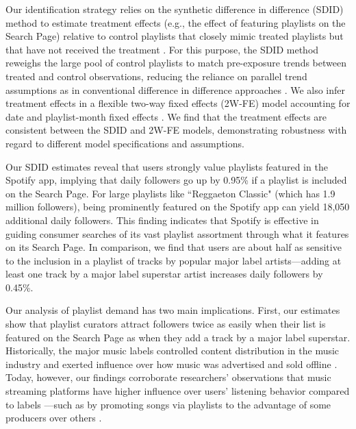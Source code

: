 Our identification strategy relies on the synthetic difference in difference (SDID) method to estimate treatment effects (e.g., the effect of featuring playlists on the Search Page) relative to control playlists that closely mimic treated playlists but that have not received the treatment \citep[e.g.,][]{berman2022value}. For this purpose, the SDID method reweighs the large pool of control playlists to match pre-exposure trends between treated and control observations, reducing the reliance on parallel trend assumptions as in conventional difference in difference approaches \citep{SDiD_AER_Arkhangelsky_21}. We also infer treatment effects in a flexible two-way fixed effects (2W-FE) model accounting for date and playlist-month fixed effects \citep[e.g.,][]{shapiro_hitsch_tuchman_2021}. We find that the treatment effects are consistent between the SDID and 2W-FE models, demonstrating robustness with regard to different model specifications and assumptions. 

Our SDID estimates reveal that users strongly value playlists featured in the Spotify app, implying that daily followers go up by 0.95\% if a playlist is included on the Search Page. For large playlists like ``Reggaeton Classic" (which has 1.9 million followers), being prominently featured on the Spotify app can yield 18,050 additional daily followers. This finding indicates that Spotify is effective in guiding consumer searches of its vast playlist assortment through what it features on its Search Page. In comparison, we find that users are about half as sensitive to the inclusion in a playlist of tracks by popular major label artists---adding at least one track by a major label superstar artist increases daily followers by 0.45\%. 

Our analysis of playlist demand has two main implications. First, our estimates show that playlist curators attract followers twice as easily when their list is featured on the Search Page as when they add a track by a major label superstar. %
Historically, the major music labels controlled content distribution in the music industry and exerted influence over how music was advertised and sold offline \citep[][]{prey_2020,du_gay_and_negus_1994}. Today, however, our findings corroborate researchers’ observations that music streaming platforms have higher influence over users’ listening behavior compared to labels%
---such as by promoting songs via playlists to the advantage of some producers over others \citep[][]{Aguiar_Waldfogel_power}. 

